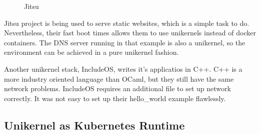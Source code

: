 \begin{figure}[h!]
\centering
\begin {sequencediagram}


\end {sequencediagram}
\caption{Jitsu \cite{jitsu}}\label{fig:jitsu}
\end{figure}

Jitsu project is being used to serve static websites, which is a simple task to do. Nevertheless, their fast boot times allows them to use unikernels instead of docker containers. The DNS server running in that example is also a unikernel, so the environment can be achieved in a pure unikernel fashion.

Another unikernel stack, IncludeOS, writes it's applicatios in C++. C++ is a more industry oriented language than OCaml, but they still have the same network problems. IncludeOS requires an additional file to set up network correctly. It was not easy to set up their hello\_world example flawlessly.
\pagebreak
\subsection{Unikernel as Kubernetes Runtime}

